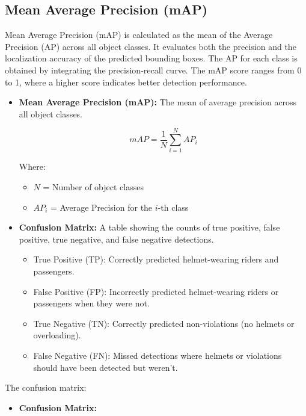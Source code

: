 \begin{refsection}
\section*{Mean Average Precision (mAP)}

Mean Average Precision (mAP) is calculated as the mean of the Average Precision (AP) across all object classes. It evaluates both the precision and the localization accuracy of the predicted bounding boxes. The AP for each class is obtained by integrating the precision-recall curve.
The mAP score ranges from 0 to 1, where a higher score indicates better detection performance.

\begin{itemize}
    \item \textbf{Mean Average Precision (mAP):} The mean of average precision across all object classes.
    
	\begin{equation}
        mAP = \frac{1}{N} \sum_{i=1}^{N} AP_i
        \label{eq:map}
    \end{equation}

    Where:
    \begin{itemize}
        \item $N$ = Number of object classes
        \item $AP_i$ = Average Precision for the $i$-th class
    \end{itemize}

    \item \textbf{Confusion Matrix:} A table showing the counts of true positive, false positive, true negative, and false negative detections.
    \begin{itemize}
        \item {True Positive (TP):} Correctly predicted helmet-wearing riders and passengers.
        \item {False Positive (FP):} Incorrectly predicted helmet-wearing riders or passengers when they were not.
        \item {True Negative (TN):} Correctly predicted non-violations (no helmets or overloading).
        \item {False Negative (FN):} Missed detections where helmets or violations should have been detected but weren’t.
    \end{itemize}
\end{itemize}

The confusion matrix:

\begin{itemize}
    \item \textbf{Confusion Matrix:}


\end{itemize}
\end{refsection}

